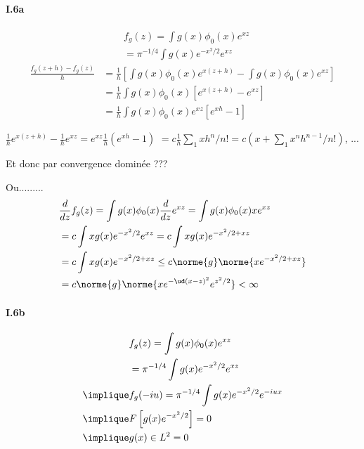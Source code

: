 \paragraph{I.6a}

\begin{align}
    & f_g(z) = \int g(x) \phi_0(x) e^{xz} \\
    &= \pi^{-1/4} \int g(x) e^{-x^2 / 2} e^{xz}
\end{align}
%
\begin{align}
    \frac{f_g(z + h) - f_g(z)}{h} &=
    \frac{1}{h} [ \int g(x) \phi_0(x) e^{x(z+h)} - \int g(x) \phi_0(x) e^{xz} ] \\
    &= \frac{1}{h} \int g(x) \phi_0(x) [e^{x(z+h)} - e^{xz}] \\
    &= \frac{1}{h} \int g(x) \phi_0(x) e^{xz} [e^{xh} - 1]
\end{align}

$\frac{1}{h} e^{x(z+h)} - \frac{1}{h} e^{xz} = e^{xz} \frac{1}{h} ( e^{xh} - 1)$
$= c \frac{1}{h} \sum_1 {xh}^n / n! = c (x + \sum_1 x^n h^{n-1} / n!) $, ...

Et donc par convergence dominée ???

Ou.........
\begin{align}
    & \frac{d}{dz} f_g(z) = \int g(x) \phi_0(x) \frac{d}{dz} e^{xz}
    = \int g(x) \phi_0(x) x e^{xz} \\
    &= c \int x g(x) e^{-x^2 / 2} e^{xz} = c \int x g(x) e^{-x^2 / 2 + xz} \\
    &= c \int x g(x) e^{-x^2 / 2 + xz} \leq c \norme{g} \norme{x e^{-x^2 / 2 + xz}} \\
    &= c \norme{g} \norme{x e^{-\ud (x-z)^2} e^{z^2 / 2}} < \infty
\end{align}

\paragraph{I.6b}

\begin{align}
    & f_g(z) = \int g(x) \phi_0(x) e^{xz} \\
    &= \pi^{-1/4} \int g(x) e^{-x^2 / 2} e^{xz} \\
%
    \implique & f_g(-iu) = \pi^{-1/4} \int g(x) e^{-x^2 / 2} e^{-iux} \\
    \implique & F \left[ g(x) e^{-x^2 / 2} \right] = 0 \\
    \implique & g(x) \in L^2 = 0
\end{align}

